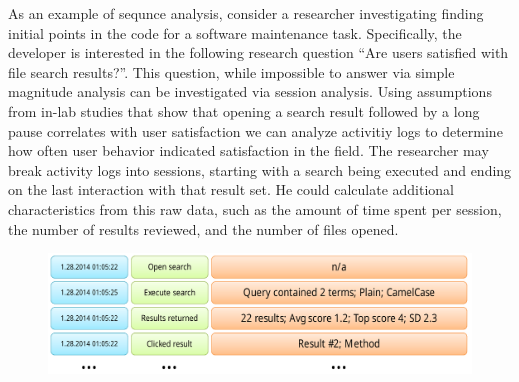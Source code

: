 As an example of sequnce analysis, consider a researcher investigating finding initial points in the code for a software maintenance task. Specifically, the developer is interested in the following research question ``Are users satisfied with file search results?''. This question, while impossible to answer via simple magnitude analysis can be investigated via session analysis. Using assumptions from in-lab studies that show that opening a search result followed by a long pause correlates with user satisfaction we can analyze activitiy logs to determine how often user behavior indicated satisfaction in the field. The researcher may break activity logs into sessions, starting with a search being executed and ending on the last interaction with that result set. He could calculate additional characteristics from this raw data, such as the amount of time spent per session, the number of results reviewed, and the number of files opened.   


\begin{figure}[t]
 \centering
\includegraphics[width=1\columnwidth]{../Graphics/activityLogActual.pdf}
\label{fig:actual}
\end{figure}


